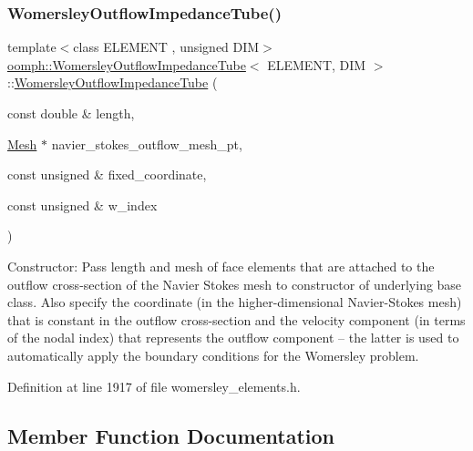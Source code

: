 \subsubsection{\texorpdfstring{Womersley\+Outflow\+Impedance\+Tube()}{WomersleyOutflowImpedanceTube()}}
{\footnotesize\ttfamily template$<$class E\+L\+E\+M\+E\+NT , unsigned D\+IM$>$ \\
\hyperlink{classoomph_1_1WomersleyOutflowImpedanceTube}{oomph\+::\+Womersley\+Outflow\+Impedance\+Tube}$<$ E\+L\+E\+M\+E\+NT, D\+IM $>$\+::\hyperlink{classoomph_1_1WomersleyOutflowImpedanceTube}{Womersley\+Outflow\+Impedance\+Tube} (\begin{DoxyParamCaption}\item[{const double \&}]{length,  }\item[{\hyperlink{classoomph_1_1Mesh}{Mesh} $\ast$}]{navier\+\_\+stokes\+\_\+outflow\+\_\+mesh\+\_\+pt,  }\item[{const unsigned \&}]{fixed\+\_\+coordinate,  }\item[{const unsigned \&}]{w\+\_\+index }\end{DoxyParamCaption})\hspace{0.3cm}{\ttfamily [inline]}}



Constructor\+: Pass length and mesh of face elements that are attached to the outflow cross-\/section of the Navier Stokes mesh to constructor of underlying base class. Also specify the coordinate (in the higher-\/dimensional Navier-\/\+Stokes mesh) that is constant in the outflow cross-\/section and the velocity component (in terms of the nodal index) that represents the outflow component -- the latter is used to automatically apply the boundary conditions for the Womersley problem. 



Definition at line 1917 of file womersley\+\_\+elements.\+h.



\subsection{Member Function Documentation}
\mbox{\label{classoomph_1_1WomersleyOutflowImpedanceTube_a31655c396b473246a6a9840d789dc046}} 
